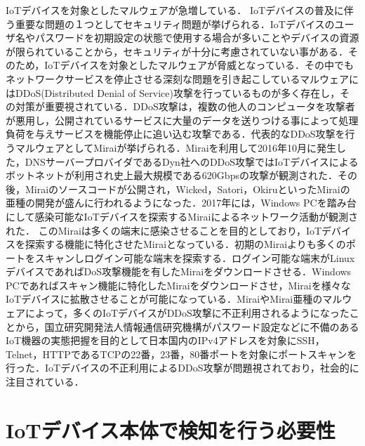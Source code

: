 IoTデバイスを対象としたマルウェアが急増している．
IoTデバイスの普及に伴う重要な問題の１つとしてセキュリティ問題が挙げられる．IoTデバイスのユーザ名やパスワードを初期設定の状態で使用する場合が多いことやデバイスの資源が限られていることから，セキュリティが十分に考慮されていない事がある．そのため，IoTデバイスを対象としたマルウェアが脅威となっている．その中でもネットワークサービスを停止させる深刻な問題を引き起こしているマルウェアにはDDoS(Distributed Denial of Service)攻撃を行っているものが多く存在し，その対策が重要視されている．DDoS攻撃は，複数の他人のコンピュータを攻撃者が悪用し，公開されているサービスに大量のデータを送りつける事によって処理負荷を与えサービスを機能停止に追い込む攻撃である．代表的なDDoS攻撃を行うマルウェアとしてMirai\cite{Mirai}が挙げられる．Miraiを利用して2016年10月に発生した，DNSサーバープロバイダであるDyn社へのDDoS攻撃ではIoTデバイスによるボットネットが利用され史上最大規模である620Gbpsの攻撃が観測された\cite{Dyn}．その後，Miraiのソースコード\cite{code}が公開され，Wicked\cite{Wicked}，Satori\cite{Satori}，Okiru\cite{Okiru}といったMiraiの亜種の開発が盛んに行われるようになった．2017年には，Windows PCを踏み台にして感染可能なIoTデバイスを探索するMiraiによるネットワーク活動が観測された\cite{newMirai}．
このMiraiは多くの端末に感染させることを目的としており，IoTデバイスを探索する機能に特化させたMiraiとなっている．初期のMiraiよりも多くのポートをスキャンしログイン可能な端末を探索する．ログイン可能な端末がLinuxデバイスであればDoS攻撃機能を有したMiraiをダウンロードさせる．Windows PCであればスキャン機能に特化したMiraiをダウンロードさせ，Miraiを様々なIoTデバイスに拡散させることが可能になっている．MiraiやMirai亜種のマルウェアによって，多くのIoTデバイスがDDoS攻撃に不正利用されるようになったことから，国立研究開発法人情報通信研究機構がパスワード設定などに不備のあるIoT機器の実態把握を目的として日本国内のIPv4アドレスを対象にSSH，Telnet，HTTPであるTCPの22番，23番，80番ポートを対象にポートスキャンを行った\cite{国立}．IoTデバイスの不正利用によるDDoS攻撃が問題視されており，社会的に注目されている．

\section{IoTデバイス本体で検知を行う必要性}

